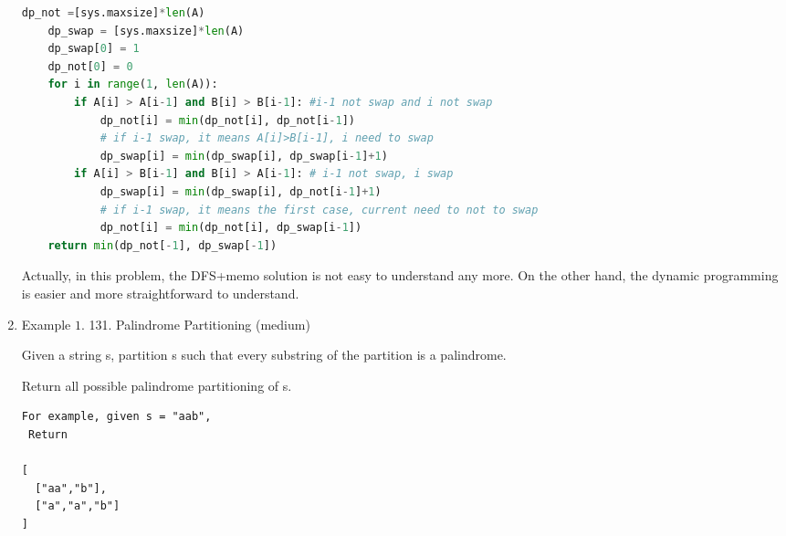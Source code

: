 \documentclass[../main.tex]{subfiles}
\begin{document}
\begin{enumerate}
\begin{lstlisting}[language=Python]
    dp_not =[sys.maxsize]*len(A)
    dp_swap = [sys.maxsize]*len(A)
    dp_swap[0] = 1
    dp_not[0] = 0
    for i in range(1, len(A)):
        if A[i] > A[i-1] and B[i] > B[i-1]: #i-1 not swap and i not swap
            dp_not[i] = min(dp_not[i], dp_not[i-1])
            # if i-1 swap, it means A[i]>B[i-1], i need to swap
            dp_swap[i] = min(dp_swap[i], dp_swap[i-1]+1)
        if A[i] > B[i-1] and B[i] > A[i-1]: # i-1 not swap, i swap
            dp_swap[i] = min(dp_swap[i], dp_not[i-1]+1)
            # if i-1 swap, it means the first case, current need to not to swap
            dp_not[i] = min(dp_not[i], dp_swap[i-1])
    return min(dp_not[-1], dp_swap[-1])
\end{lstlisting}
Actually, in this problem, the DFS+memo solution is not easy to understand any more. On the other hand, the dynamic programming is easier and more straightforward to understand. 

\item Example $1$. 131. Palindrome Partitioning (medium)

Given a string s, partition s such that every substring of the partition is a palindrome.

Return all possible palindrome partitioning of s.
\begin{lstlisting}
For example, given s = "aab",
 Return

[
  ["aa","b"],
  ["a","a","b"]
]
\end{lstlisting}


\end{enumerate}
\end{document}
